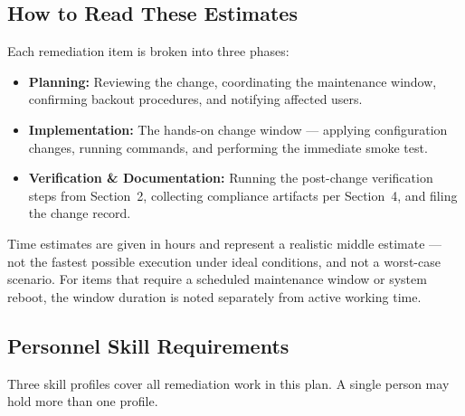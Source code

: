 \documentclass[12pt]{article}
\begin{document}
\subsection{How to Read These Estimates}
 
Each remediation item is broken into three phases:
 
\begin{itemize}[leftmargin=1.5em, itemsep=2pt]
  \item \textbf{Planning:} Reviewing the change, coordinating the maintenance
    window, confirming backout procedures, and notifying affected users.
  \item \textbf{Implementation:} The hands-on change window --- applying
    configuration changes, running commands, and performing the immediate
    smoke test.
  \item \textbf{Verification \& Documentation:} Running the post-change
    verification steps from Section~2, collecting compliance artifacts per
    Section~4, and filing the change record.
\end{itemize}
 
Time estimates are given in hours and represent a realistic middle estimate
--- not the fastest possible execution under ideal conditions, and not a
worst-case scenario. For items that require a scheduled maintenance window
or system reboot, the window duration is noted separately from active working
time.
 
\subsection{Personnel Skill Requirements}
 
Three skill profiles cover all remediation work in this plan. A single
person may hold more than one profile.
 
\bigskip
 
\end{document}
